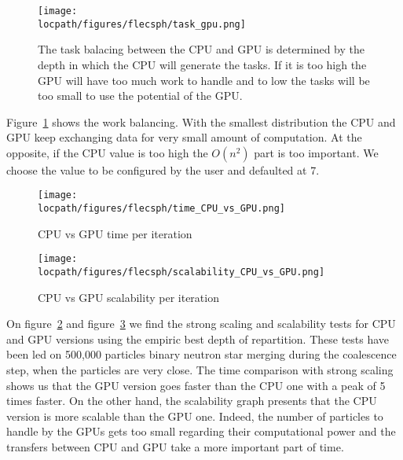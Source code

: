 \begin{figure}[t!]
\centering
\texttt{[image: \\locpath/figures/flecsph/task\_gpu.png]}
\caption[CPU-GPU tasks blancing]{The task balacing between the CPU and GPU is determined by the depth in which the CPU will generate the tasks. If it is too high the GPU will have too much work to handle and to low the tasks will be too small to use the potential of the GPU.}
\label{fig:cpu_gpu_rep}
\end{figure}%

Figure~\ref{fig:cpu_gpu_rep} shows the work balancing. 
With the smallest distribution the CPU and GPU keep exchanging data for very small amount of computation. 
At the opposite, if the CPU value is too high the $O(n^2)$ part is too important. 
We choose the value to be configured by the user and defaulted at 7.

\begin{figure}[t!]
\centering
\centering
	\texttt{[image: \\locpath/figures/flecsph/time\_CPU\_vs\_GPU.png]}
	\caption{CPU vs GPU time per iteration}
	\label{fig:cpu_gpu_time}
\end{figure}

\begin{figure}[t!]
\centering
	\texttt{[image: \\locpath/figures/flecsph/scalability\_CPU\_vs\_GPU.png]}
	\caption{CPU vs GPU scalability per iteration}
	\label{fig:cpu_gpu_scala}
\end{figure}

On figure~\ref{fig:cpu_gpu_time} and figure~\ref{fig:cpu_gpu_scala} we find the strong scaling and scalability tests for CPU and GPU versions using the empiric best depth of repartition.
These tests have been led on 500,000 particles binary neutron star merging during the coalescence step, when the particles are very close. 
The time comparison with strong scaling shows us that the GPU version goes faster than the CPU one with a peak of 5 times faster. 
On the other hand, the scalability graph presents that the CPU version is more scalable than the GPU one. 
Indeed, the number of particles to handle by the GPUs gets too small regarding their computational power and the transfers between CPU and GPU take a more important part of time. 

